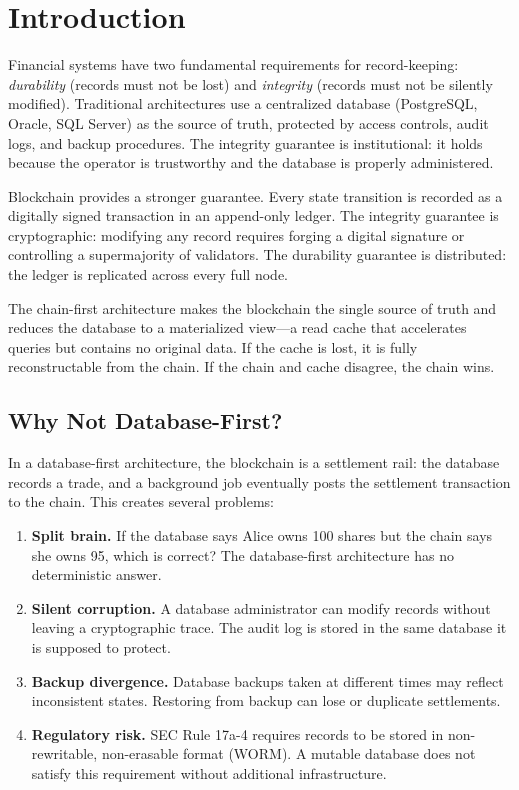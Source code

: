 \section{Introduction}

\label{sec:intro}

Financial systems have two fundamental requirements for record-keeping:
\emph{durability} (records must not be lost) and \emph{integrity}
(records must not be silently modified).  Traditional architectures
use a centralized database (PostgreSQL, Oracle, SQL Server) as the
source of truth, protected by access controls, audit logs, and backup
procedures.  The integrity guarantee is institutional: it holds because
the operator is trustworthy and the database is properly administered.

Blockchain provides a stronger guarantee.  Every state transition is
recorded as a digitally signed transaction in an append-only ledger.
The integrity guarantee is cryptographic: modifying any record requires
forging a digital signature or controlling a supermajority of
validators.  The durability guarantee is distributed: the ledger is
replicated across every full node.

The chain-first architecture makes the blockchain the single source of
truth and reduces the database to a materialized view---a read cache
that accelerates queries but contains no original data.  If the cache
is lost, it is fully reconstructable from the chain.  If the chain
and cache disagree, the chain wins.

\subsection{Why Not Database-First?}

In a database-first architecture, the blockchain is a settlement
rail: the database records a trade, and a background job eventually
posts the settlement transaction to the chain.  This creates several
problems:

\begin{enumerate}[nosep]
  \item \textbf{Split brain.}  If the database says Alice owns 100
        shares but the chain says she owns 95, which is correct?  The
        database-first architecture has no deterministic answer.
  \item \textbf{Silent corruption.}  A database administrator can
        modify records without leaving a cryptographic trace.  The
        audit log is stored in the same database it is supposed to
        protect.
  \item \textbf{Backup divergence.}  Database backups taken at
        different times may reflect inconsistent states.  Restoring
        from backup can lose or duplicate settlements.
  \item \textbf{Regulatory risk.}  SEC Rule 17a-4 requires records
        to be stored in non-rewritable, non-erasable format (WORM).
        A mutable database does not satisfy this requirement without
        additional infrastructure.
\end{enumerate}

